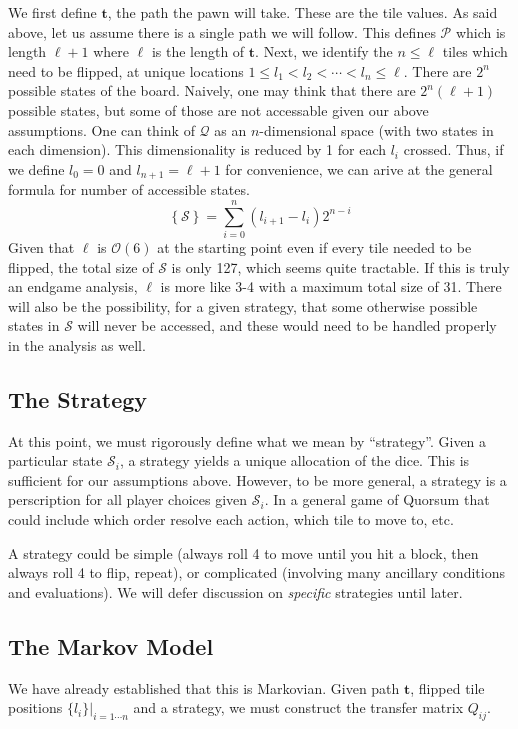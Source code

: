 \documentclass[letterpaper]{article}
\begin{document}
We first define $\mathbf{t}$, the path the pawn will take.
These are the tile values.  As said above, let us assume there is a single
path we will follow.  This defines $\mathcal{P}$ which is length $\ell+1$ where
$\ell$ is the length of $\mathbf{t}$.  Next, we identify the $n\leq \ell$ 
tiles which need to be flipped, at unique locations $1\leq l_1 < l_2 < \cdots < l_n \leq \ell$.  There are
$2^n$ possible states of the board.  Naively, one may think that there are
$2^n(\ell+1)$ possible states, but some of those are not accessable given our
above assumptions.  One can think of $\mathcal{Q}$ as an $n$-dimensional space
(with two states in each dimension).  This dimensionality is reduced by 1
for each $l_i$ crossed.  Thus, if we define $l_0=0$ and $l_{n+1}=\ell+1$ for
convenience, we can arive at the general formula for number of accessible
states.
\begin{equation}
	\left\{\mathcal{S}\right\} = \sum_{i=0}^{n} (l_{i+1}-l_i)2^{n-i}
\end{equation}
Given that $\ell$ is $\mathcal{O}(6)$ at the starting point even if every tile
needed to be flipped, the total size of $\mathcal{S}$ is only 127, which seems
quite tractable.  If this is truly an endgame analysis, $\ell$ is more like 3-4
with a maximum total size of 31.  There will also be the possibility, for a
given strategy, that some otherwise possible states in $\mathcal{S}$ will never
be accessed, and these would need to be handled properly in the analysis as
well.

\subsection{The Strategy}
At this point, we must rigorously define what we mean by ``strategy''.  Given
a particular state $\mathcal{S}_i$, a strategy yields a unique allocation of
the dice.  This is sufficient for our assumptions above.  However, to be more
general, a strategy is a perscription for all player choices given 
$\mathcal{S}_i$.  In a general game of Quorsum that could include which order
resolve each action, which tile to move to, etc.

A strategy could be simple (always roll 4 to move until you hit a block, then
always roll 4 to flip, repeat), or complicated (involving many ancillary
conditions and evaluations).  We will defer discussion on \textit{specific}
strategies until later.  

\subsection{The Markov Model}
We have already established that this is Markovian.  Given path $\mathbf{t}$,
flipped tile positions $\{l_i\}|_{i=1\cdots n}$ and a strategy, we must
construct the transfer matrix $Q_{ij}$.
\end{document}

